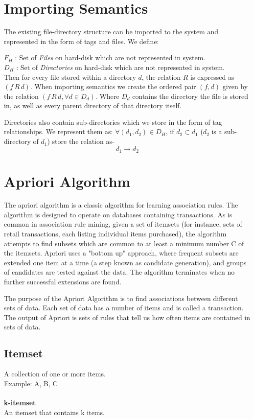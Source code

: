 \section{Importing Semantics}
The existing file-directory structure can be imported to the system and represented in the form of tags and files. We define: 

\noindent $F_{H}$ : Set of \emph{Files} on hard-disk which are not represented in system.\\
$D_{H}$ : Set of \emph{Directories} on hard-disk which are not represented in system. \\

\noindent Then for every file stored within a directory $d$, the relation $R$ is expressed as 
$(f  \, R  \, d)$.
When importing semantics we create the ordered pair $(f,d)$ given by the relation $(f  \, R \,  d, \forall d \in D_{d})$. Where $D_{d}$ contains the directory the file is stored in, as well as every parent directory of that directory itself.

\noindent Directories also contain sub-directories which we store in the form of tag relationships. We represent them as:
$\forall (d_{1}, d_{2}) \in D_{H}$, if $d_{2} \subset d_{1}$ ($d_{2}$ is a sub-directory of $d_{1}$) store the relation as-
$$d_{1} \to d_{2}$$


\section{Apriori Algorithm}
The apriori algorithm is a classic algorithm for learning association rules. The
 algorithm is designed to operate on databases containing transactions. As is
common in association rule mining, given a set of itemsets (for instance, sets
of retail transactions, each listing individual items purchased), the algorithm
attempts to find subsets which are common to at least a minimum number C of the
itemsets. Apriori uses a "bottom up" approach, where frequent subsets are
extended one item at a time (a step known as candidate generation), and groups
of candidates are tested against the data. The algorithm terminates when no
further successful extensions are found.

The purpose of the Apriori Algorithm is to find associations between different sets of data.
Each set of data has a number of items and is called a transaction.
The output of Apriori is sets of rules that tell us how often items are contained in sets of data.

\subsection{Itemset}
A collection of one or more items. \\
Example: {A, B, C} \\ \\
\textbf{k-itemset} \\
An itemset that contains k items.

